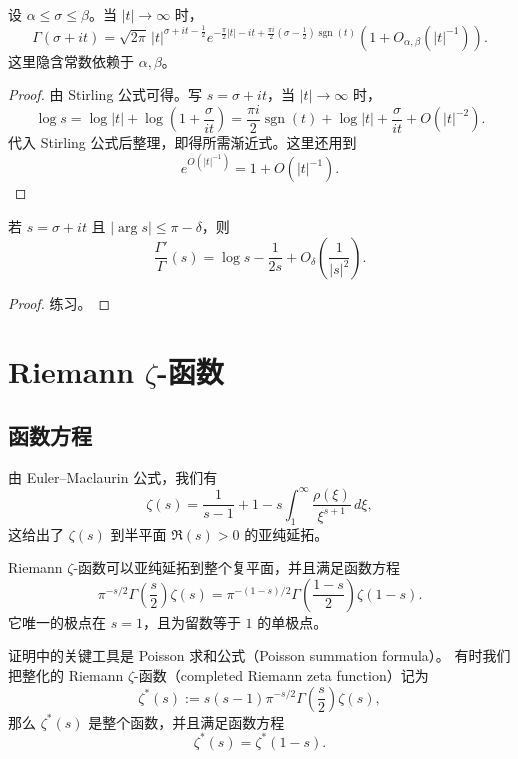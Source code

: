 \begin{corollary}[原文 Corollary 7.8]
	设 $\alpha\leq \sigma\leq \beta$。当 $|t|\to\infty$ 时，
	\[
		\Gamma(\sigma+it)
		=
		\sqrt{2\pi}\,
		|t|^{\sigma+it-\frac12}
		e^{-\frac{\pi}{2}|t|-it+\frac{\pi i}{2}(\sigma-\frac12)\operatorname{sgn}(t)}
		\left(1+O_{\alpha,\beta}\left(|t|^{-1}\right)\right).
	\]
	这里隐含常数依赖于 $\alpha,\beta$。
\end{corollary}

\begin{proof}
	由 Stirling 公式可得。写 $s=\sigma+it$，当 $|t|\to\infty$ 时，
	\[
		\log s=\log |t|+\log\left(1+\frac{\sigma}{it}\right)
		=
		\frac{\pi i}{2}\operatorname{sgn}(t)
		+\log |t|+\frac{\sigma}{it}
		+O\left(|t|^{-2}\right).
	\]
	代入 Stirling 公式后整理，即得所需渐近式。这里还用到
	\[
		e^{O(|t|^{-1})}=1+O(|t|^{-1}).
	\]
\end{proof}

\begin{corollary}[原文 Corollary 7.9]
	若 $s=\sigma+it$ 且 $|\arg s|\leq \pi-\delta$，则
	\[
		\frac{\Gamma'}{\Gamma}(s)
		=
		\log s-\frac{1}{2s}
		+
		O_\delta\left(\frac{1}{|s|^2}\right).
	\]
\end{corollary}

\begin{proof}
	练习。
\end{proof}

\chapter{\texorpdfstring{Riemann \(\zeta\)-函数}{Riemann zeta-函数}}
\label{chap:riemann-zeta-function}

\section{函数方程}

由 Euler--Maclaurin 公式，我们有
\[
	\zeta(s)
	=
	\frac{1}{s-1}+1
	-s\int_1^\infty \frac{\rho(\xi)}{\xi^{s+1}}\,d\xi,
\]
这给出了 $\zeta(s)$ 到半平面 $\Re(s)>0$ 的亚纯延拓。

\begin{theorem}[原文 Theorem 8.1]
	Riemann $\zeta$-函数可以亚纯延拓到整个复平面，并且满足函数方程
	\[
		\pi^{-s/2}\Gamma\left(\frac{s}{2}\right)\zeta(s)
		=
		\pi^{-(1-s)/2}
		\Gamma\left(\frac{1-s}{2}\right)\zeta(1-s).
	\]
	它唯一的极点在 $s=1$，且为留数等于 $1$ 的单极点。
\end{theorem}

\begin{remark}
	证明中的关键工具是 Poisson 求和公式（Poisson summation formula）。
	有时我们把整化的 Riemann $\zeta$-函数（completed Riemann zeta function）记为
	\[
		\zeta^*(s):=
		s(s-1)\pi^{-s/2}\Gamma\left(\frac{s}{2}\right)\zeta(s),
	\]
	那么 $\zeta^*(s)$ 是整个函数，并且满足函数方程
	\[
		\zeta^*(s)=\zeta^*(1-s).
	\]
\end{remark}

